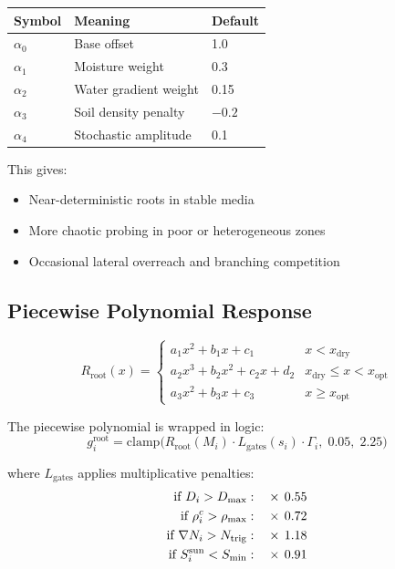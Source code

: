 \documentclass[11pt]{article}
\begin{document}
\begin{center}
\begin{tabular}{lll}
\toprule
\textbf{Symbol} & \textbf{Meaning} & \textbf{Default} \\
\midrule
$\alpha_0$ & Base offset & 1.0 \\
$\alpha_1$ & Moisture weight & 0.3 \\
$\alpha_2$ & Water gradient weight & 0.15 \\
$\alpha_3$ & Soil density penalty & $-0.2$ \\
$\alpha_4$ & Stochastic amplitude & 0.1 \\
\bottomrule
\end{tabular}
\end{center}

This gives:
\begin{itemize}
  \item Near-deterministic roots in stable media
  \item More chaotic probing in poor or heterogeneous zones
  \item Occasional lateral overreach and branching competition
\end{itemize}

\subsection{Piecewise Polynomial Response}

\begin{equation}
  R_{\mathrm{root}}(x) =
  \begin{cases}
    a_1 x^2 + b_1 x + c_1 & x < x_{\mathrm{dry}} \\
    a_2 x^3 + b_2 x^2 + c_2 x + d_2 & x_{\mathrm{dry}} \leq x < x_{\mathrm{opt}} \\
    a_3 x^2 + b_3 x + c_3 & x \geq x_{\mathrm{opt}}
  \end{cases}
\end{equation}

The piecewise polynomial is wrapped in logic:
\begin{equation}
  g_i^{\mathrm{root}} = \mathrm{clamp}\!\bigl(
    R_{\mathrm{root}}(M_i) \cdot L_{\mathrm{gates}}(s_i)
    \cdot \Gamma_i,\;0.05,\;2.25
  \bigr)
\end{equation}

where $L_{\mathrm{gates}}$ applies multiplicative penalties:
\begin{align}
  \text{if } D_i > D_{\max}: &\quad \times\, 0.55 \notag\\
  \text{if } \rho_i^c > \rho_{\max}: &\quad \times\, 0.72 \notag\\
  \text{if } \nabla N_i > N_{\mathrm{trig}}: &\quad \times\, 1.18 \notag\\
  \text{if } S_i^{\mathrm{sun}} < S_{\min}: &\quad \times\, 0.91
\end{align}
\end{document}
